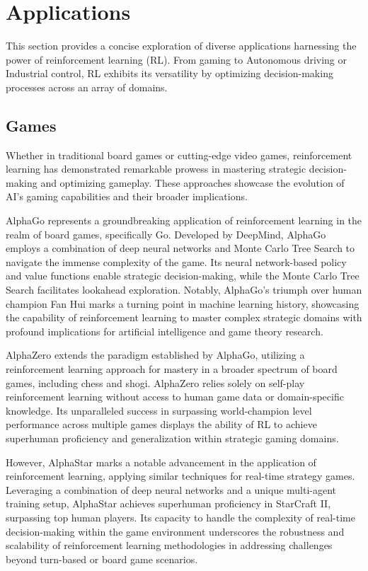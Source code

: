 \section{Applications}\label{sec:rl-applications}
This section provides a concise exploration of diverse applications harnessing the power of reinforcement learning (RL). From gaming to Autonomous driving or Industrial control, RL exhibits its versatility by optimizing decision-making processes across an array of domains.

\subsection*{Games}
Whether in traditional board games or cutting-edge video games, reinforcement learning has demonstrated remarkable prowess in mastering strategic decision-making and optimizing gameplay. These approaches showcase the evolution of AI's gaming capabilities and their broader implications.

AlphaGo\cite{silver2016mastering} represents a groundbreaking application of reinforcement learning in the realm of board games, specifically Go. Developed by DeepMind, AlphaGo employs a combination of deep neural networks and Monte Carlo Tree Search to navigate the immense complexity of the game. Its neural network-based policy and value functions enable strategic decision-making, while the Monte Carlo Tree Search facilitates lookahead exploration. Notably, AlphaGo's triumph over human champion Fan Hui marks a turning point in machine learning history, showcasing the capability of reinforcement learning to master complex strategic domains with profound implications for artificial intelligence and game theory research.

AlphaZero\cite{silver2017mastering} extends the paradigm established by AlphaGo, utilizing a reinforcement learning approach for mastery in a broader spectrum of board games, including chess and shogi. AlphaZero relies solely on self-play reinforcement learning without access to human game data or domain-specific knowledge. Its unparalleled success in surpassing world-champion level performance across multiple games displays the ability of RL to achieve superhuman proficiency and generalization within strategic gaming domains.

However, AlphaStar\cite{vinyals2019grandmaster} marks a notable advancement in the application of reinforcement learning, applying similar techniques for real-time strategy games. Leveraging a combination of deep neural networks and a unique multi-agent training setup, AlphaStar achieves superhuman proficiency in StarCraft II, surpassing top human players. Its capacity to handle the complexity of real-time decision-making within the game environment underscores the robustness and scalability of reinforcement learning methodologies in addressing challenges beyond turn-based or board game scenarios.

